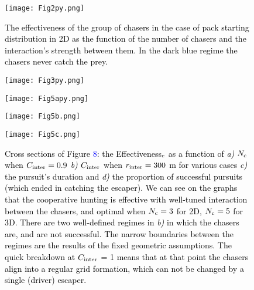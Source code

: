 \documentclass[12pt,a4paper,final]{iopart}
\newcommand{\revision}{\textcolor{black}}
\newcommand{\revisiontwo}{\textcolor{black}}
\begin{document}
\begin{figure}
\begin{center}
\vspace{-0.5cm}
\texttt{[image: Fig2py.png]}
\vspace{-0.05cm}
\caption{\revision{The effectiveness of the group of chasers in the case of pack starting distribution in 2D as the function of the number of chasers and the interaction's strength between them. In the dark blue regime the chasers never catch the prey. }} 
\label{fig:Fig2p}
\end{center}
\begin{minipage}[c]{0.49\textwidth}
\texttt{[image: Fig3py.png]}
\end{minipage}
\begin{minipage}[c]{0.5\textwidth}
\texttt{[image: Fig5apy.png]}
\end{minipage}\hfill
\begin{minipage}[c]{0.49\textwidth}
\texttt{[image: Fig5b.png]}
\end{minipage}
\begin{minipage}[c]{0.5\textwidth}
\texttt{[image: Fig5c.png]}   
\end{minipage}\hfill
\vspace{-0.05cm}
\caption{\revision{Cross sections of Figure \textcolor{blue}{8}: the Effectiveness$_{\rm c}$ as a function of {\it a)} $N_{\revisiontwo{\rm c}}$ when $C_{\rm inter} = 0.9$ {\it b)}  $C_{\rm inter}$ when $r_{\rm inter} = 300$ m for various cases {\it c)} the pursuit's duration and  {\it d)} \revisiontwo{the} proportion of successful pursuits (which ended in catching the escaper). We can  see on the graphs that the cooperative hunting is effective with well-tuned interaction between the chasers,  and optimal when $N_{\revisiontwo{\rm c}} = 3$ for 2D, $N_{\revisiontwo{\rm c}} = 5$ for 3D. There are two well-defined regimes in {\it b)} in which the chasers are, and are not successful. The narrow boundaries between the regimes are the results of the fixed geometric  assumptions.  The quick breakdown at $C_{\rm inter}$ = 1 means that at that point the chasers align into a regular grid formation, which can not be changed by a single (driver) escaper.}}
\end{figure}
\end{document}
